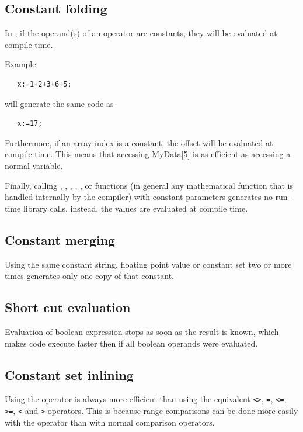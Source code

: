 \subsection{Constant folding}

In \fpc, if the operand(s) of an operator are constants, they
will be evaluated at compile time.

Example

\begin{verbatim}
   x:=1+2+3+6+5;
\end{verbatim}
will generate the same code as
\begin{verbatim}
   x:=17;
\end{verbatim}

Furthermore, if an array index is a constant, the offset will
be evaluated at compile time. This means that accessing MyData[5]
is as efficient as accessing a normal variable.

Finally, calling , , , , ,
or  functions (in general any mathematical function that is
handled internally by the compiler) with constant parameters generates no
run-time library calls, instead, the values are evaluated at
compile time.

\subsection{Constant merging}

Using the same constant string, floating point value or constant set 
two or more times generates only one copy of that constant.

\subsection{Short cut evaluation}

Evaluation of boolean expression stops as soon as the result is
known, which makes code execute faster then if all boolean operands
were evaluated.

\subsection{Constant set inlining}

Using the  operator is always more efficient than using the
equivalent \verb|<>|, \verb|=|, \verb|<=|, \verb|>=|, \verb|<| and \verb|>|
operators. This is because range comparisons can be done more easily with
the  operator than with normal comparison operators.

